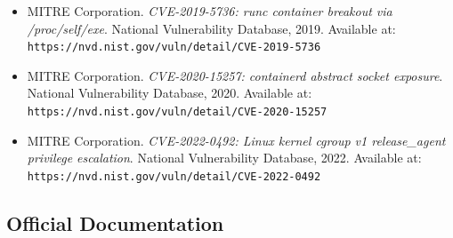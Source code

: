 \begin{itemize}

    \item MITRE Corporation.
    \textit{CVE-2019-5736: runc container breakout via
    /proc/self/exe}.
    National Vulnerability Database, 2019.
    Available at: \texttt{https://nvd.nist.gov/vuln/detail/CVE-2019-5736}

    \item MITRE Corporation.
    \textit{CVE-2020-15257: containerd abstract socket
    exposure}.
    National Vulnerability Database, 2020.
    Available at: \texttt{https://nvd.nist.gov/vuln/detail/CVE-2020-15257}

    \item MITRE Corporation.
    \textit{CVE-2022-0492: Linux kernel cgroup v1
    release\_agent privilege escalation}.
    National Vulnerability Database, 2022.
    Available at: \texttt{https://nvd.nist.gov/vuln/detail/CVE-2022-0492}

\end{itemize}

\subsection{Official Documentation}

